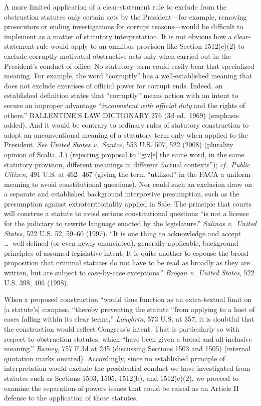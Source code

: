 A more limited application of a clear-statement rule to exclude from the obstruction statutes only certain acts by the President---for example, removing prosecutors or ending investigations for corrupt reasons---would be difficult to implement as a matter of statutory interpretation.
It is not obvious how a clear-statement rule would apply to an omnibus provision like Section 1512(c)(2) to exclude corruptly motivated obstructive acts only when carried out in the President's conduct of office.
No statutory term could easily bear that specialized meaning.
For example, the word ``corruptly'' has a well-established meaning that does not exclude exercises of official power for corrupt ends.
Indeed, an established definition states that ``corruptly'' means action with an intent to secure an improper advantage ``\textit{inconsistent with official duty} and the rights of others.''
BALLENTINE'S LAW DICTIONARY 276 (3d ed.~1969) (emphasis added).
And it would be contrary to ordinary rules of statutory construction to adopt an unconventional meaning of a statutory term only when applied to the President.
\textit{See United States v.\ Santos}, 553 U.S. 507, 522 (2008) (plurality opinion of Scalia, J.) (rejecting proposal to ``giv[e] the same word, in the same statutory provision, different meanings in different factual contexts'');
\textit{cf.~Public Citizen}, 491 U.S. at 462- 467 (giving the term ``utilized'' in the FACA a uniform meaning to avoid constitutional questions).
Nor could such an exclusion draw on a separate and established background interpretive presumption, such as the presumption against extraterritoriality applied in Sale.
The principle that courts will construe a statute to avoid serious constitutional questions ``is not a license for the judiciary to rewrite language enacted by the legislature.''
\textit{Salinas v.\ United States}, 522 U.S. 52, 59--60 (1997).
``It is one thing to acknowledge and accept \dots\ well defined (or even newly enunciated), generally applicable, background principles of assumed legislative intent.
It is quite another to espouse the broad proposition that criminal statutes do not have to be read as broadly as they are written, but are subject to case-by-case exceptions.''
\textit{Brogan v.\ United States}, 522 U.S. 398, 406 (1998).

When a proposed construction ``would thus function as an extra-textual limit on [a statute's] compass, ``thereby preventing the statute ``from applying to a host of cases falling within its clear terms,'' \textit{Loughrin}, 573 U.S. at 357, it is doubtful that the construction would reflect Congress's intent.
That is particularly so with respect to obstruction statutes, which ``have been given a broad and all-inclusive meaning.''
\textit{Rainey}, 757 F.3d at 245 (discussing Sections 1503 and 1505) (internal quotation marks omitted).
Accordingly, since no established principle of interpretation would exclude the presidential conduct we have investigated from statutes such as Sections 1503, 1505, 1512(b), and 1512(c)(2), we proceed to examine the separation-of-powers issues that could be raised as an Article II defense to the application of those statutes.


